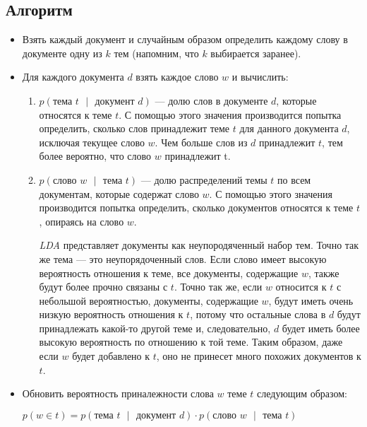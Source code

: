 \subsection{Алгоритм}

\begin{itemize}
\item Взять каждый документ и случайным образом определить каждому слову в документе одну из $k$ тем (напомним, что $k$ выбирается заранее).

\item Для каждого документа $d$ взять каждое слово $w$ и вычислить:
\begin{enumerate}
\item $p(\text{тема } t \text{ } | \text{ }  \text{документ } d)$ --- долю слов в документе $d$, которые относятся к теме $t$. С помощью этого значения производится попытка определить, сколько слов принадлежит теме $t$ для данного документа $d$, исключая текущее слово $w$. Чем больше слов из $d$ принадлежит $t$, тем более вероятно, что слово $w$ принадлежит t.
\item $p(\text{слово } w \text{ }  | \text{ }  \text{тема } t)$ --- долю распределений темы $t$ по всем документам, которые содержат слово $w$. С помощью этого значения производится попытка определить, сколько документов относятся к теме $t$, опираясь на слово $w$.

\textit{LDA} представляет документы как неупородяченный набор тем. Точно так же тема --- это неупорядоченный слов. Если слово имеет высокую вероятность отношения к теме, все документы, содержащие $w$, также будут более прочно связаны с $t$. Точно так же, если $w$ относится к $t$ с небольшой вероятностью, документы, содержащие $w$, будут иметь очень низкую вероятность отношения к $t$, потому что остальные слова в $d$ будут принадлежать какой-то другой теме и, следовательно, $d$ будет иметь более высокую вероятность по отношению к той теме. Таким образом, даже если $w$ будет добавлено к $t$, оно не принесет много похожих документов к $t$. 
\end{enumerate}

\item Обновить вероятность приналежности слова $w$ теме $t$ следующим образом:
\begin{center}
$p(w \in t) = p(\text{тема } t \text{ }  | \text{ }  \text{документ } d) \cdot p(\text{слово } w \text{ }  | \text{ }  \text{тема } t)$
\end{center}
\end{itemize}